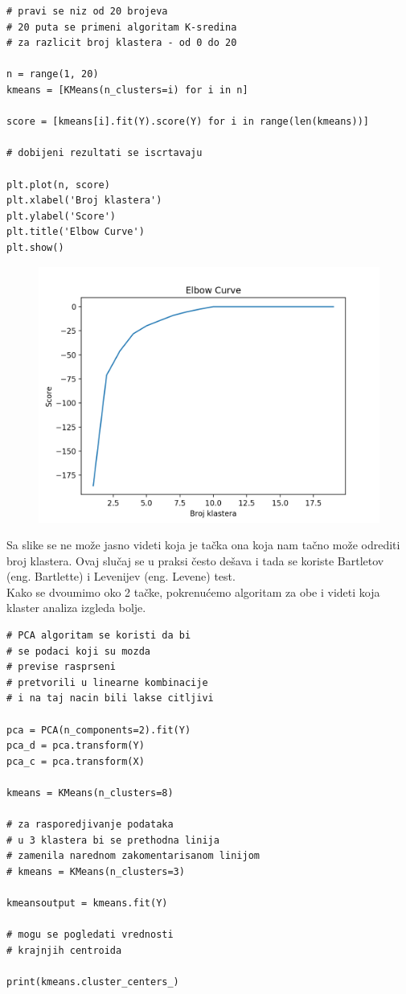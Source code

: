 \documentclass[12pt,a4paper]{article}
\begin{document}
\begin{lstlisting}[mathescape=true]
# pravi se niz od 20 brojeva
# 20 puta se primeni algoritam K-sredina
# za razlicit broj klastera - od 0 do 20

n = range(1, 20)
kmeans = [KMeans(n_clusters=i) for i in n]
  
score = [kmeans[i].fit(Y).score(Y) for i in range(len(kmeans))]

# dobijeni rezultati se iscrtavaju

plt.plot(n, score)
plt.xlabel('Broj klastera')
plt.ylabel('Score')
plt.title('Elbow Curve')
plt.show()
\end{lstlisting}

\begin{figure}[H]
  \centering
  \includegraphics[width=15cm]{elbow_curve.png}
\end{figure}

Sa slike se ne mo\v ze jasno videti koja je ta\v cka ona koja nam ta\v cno mo\v ze odrediti broj klastera. Ovaj slu\v caj se u praksi \v cesto de\v sava i tada se koriste Bartletov (eng. Bartlette) i Levenijev (eng. Levene) test.
\\
Kako se dvoumimo oko 2 ta\v cke, pokrenu\' cemo algoritam za obe i videti koja klaster analiza izgleda bolje.
\\
\begin{lstlisting}[mathescape=true]
# PCA algoritam se koristi da bi 
# se podaci koji su mozda
# previse rasprseni
# pretvorili u linearne kombinacije
# i na taj nacin bili lakse citljivi

pca = PCA(n_components=2).fit(Y)
pca_d = pca.transform(Y)
pca_c = pca.transform(X)

kmeans = KMeans(n_clusters=8)

# za rasporedjivanje podataka
# u 3 klastera bi se prethodna linija
# zamenila narednom zakomentarisanom linijom
# kmeans = KMeans(n_clusters=3)

kmeansoutput = kmeans.fit(Y)

# mogu se pogledati vrednosti
# krajnjih centroida

print(kmeans.cluster_centers_)
\end{lstlisting}
\end{document}
